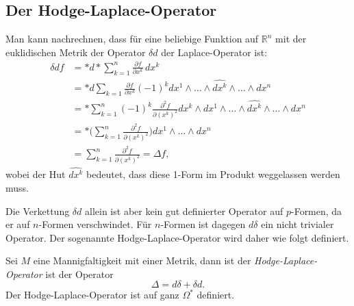 %
%
\subsection{Der Hodge-Laplace-Operator}
Man kann nachrechnen, dass für eine beliebige Funktion auf
$\mathbb{R}^n$ mit der euklidischen Metrik der Operator $\delta d$
der Laplace-Operator ist:
\begin{align*}
\delta d f
&=
{\ast}d{\ast}\sum_{k=1}^n \frac{\partial f}{\partial x^k}\,dx^k
\\
&=
{\ast}d\sum_{k=1} \frac{\partial f}{\partial x^k}
(-1)^k
dx^1\wedge\dots\wedge \widehat{dx^k}\wedge\dots\wedge dx^n
\\
&=
{\ast}
\sum_{k=1}^n
(-1)^k
\frac{\partial^2 f}{\partial (x^k)^2}
dx^k\wedge dx^1\wedge\dots\wedge\widehat{dx^k}\wedge\dots\wedge dx^n
\\
&=
{\ast}
\biggl(
\sum_{k=1}^n
\frac{\partial^2 f}{\partial (x^k)^2}
\biggr)
dx^1\wedge\dots\wedge dx^n
\\
&=
\sum_{k=1}^n \frac{\partial^2 f}{\partial (x^k)^2}
=
\Delta f,
\end{align*}
wobei der Hut $\widehat{dx^k}$ bedeutet, dass diese 1-Form im
Produkt weggelassen werden muss.

Die Verkettung $\delta d$ allein ist aber kein gut definierter
Operator auf $p$-Formen, da er auf $n$-Formen verschwindet.
Für $n$-Formen ist dagegen $d\delta$ ein nicht trivialer Operator.
Der sogenannte Hodge-Laplace-Operator wird daher wie folgt definiert.

\begin{definition}
\label{buch:hodge:laplace:def:hodgelaplace}
Sei $M$ eine Mannigfaltigkeit mit einer Metrik, dann ist
der {\em Hodge-Laplace-Operator} ist der Operator
%
\[
\Delta = d\delta + \delta d.
\]
Der Hodge-Laplace-Operator ist auf ganz $\Omega^*$ definiert.
\end{definition}

